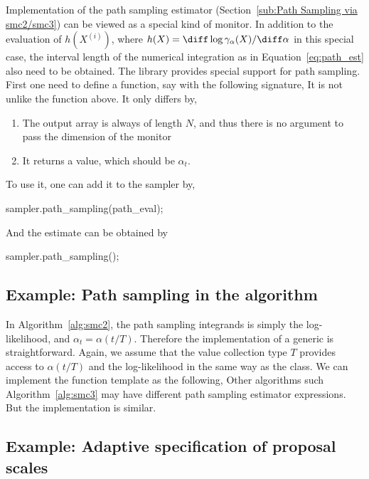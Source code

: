 Implementation of the path sampling estimator (Section~\ref{sub:Path Sampling via smc2/smc3}) can be viewed as a special kind of monitor. In addition to the evaluation of $h(X^{(i)})$, where $h(X) = \diff\log\gamma_{\alpha}(X)/\diff\alpha$ in this special case, the interval length of the numerical integration as in Equation~\eqref{eq:path_est} also need to be obtained. The \vsmc library provides special support for path sampling. First one need to define a function, say  with the following signature,
It is not unlike the  function above. It only differs by,
\begin{enumerate}
  \item The output array  is always of length $N$, and thus there is no argument to pass the dimension of the monitor
  \item It returns a value, which should be $\alpha_t$.
\end{enumerate}
To use it, one can add it to the sampler by,
\begin{cppcode}
sampler.path_sampling(path_eval);
\end{cppcode}
And the estimate can be obtained by
\begin{cppcode}
sampler.path_sampling();
\end{cppcode}

\subsection{Example: Path sampling in the \smc[2] algorithm}
\label{sub:Example: Path sampling with the SMC2 algorithm}

In Algorithm~\ref{alg:smc2}, the path sampling integrands is simply the log-likelihood, and $\alpha_t = \alpha(t/T)$. Therefore the implementation of a generic  is straightforward. Again, we assume that the value collection type $T$ provides access to $\alpha(t/T)$ and the log-likelihood in the same way as the  class. We can implement the function template as the following,
Other \smc algorithms such Algorithm~\ref{alg:smc3} may have different path sampling estimator expressions. But the implementation is similar.

\subsection{Example: Adaptive specification of proposal scales}
\label{sub:Example: Adaptive specification of proposal scales}

